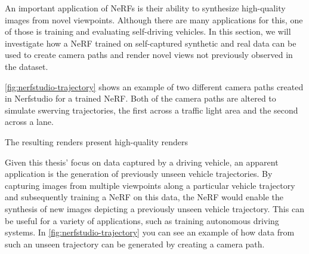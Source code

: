 An important application of NeRFs is their ability to synthesize high-quality images from novel viewpoints. Although there are many applications for this, one of those is training and evaluating self-driving vehicles. In this section, we will investigate how a NeRF trained on self-captured synthetic and real data can be used to create camera paths and render novel views not previously observed in the dataset.




\autoref{fig:nerfstudio-trajectory} shows an example of two different camera paths created in Nerfstudio for a trained NeRF. Both of the camera paths are altered to simulate swerving trajectories, the first across a traffic light area and the second across a lane. 

The resulting renders present high-quality renders





Given this thesis' focus on data captured by a driving vehicle, an apparent application is the generation of previously unseen vehicle trajectories. By capturing images from multiple viewpoints along a particular vehicle trajectory and subsequently training a NeRF on this data, the NeRF would enable the synthesis of new images depicting a previously unseen vehicle trajectory. This can be useful for a variety of applications, such as training autonomous driving systems. In \autoref{fig:nerfstudio-trajectory} you can see an example of how data from such an unseen trajectory can be generated by creating a camera path.





